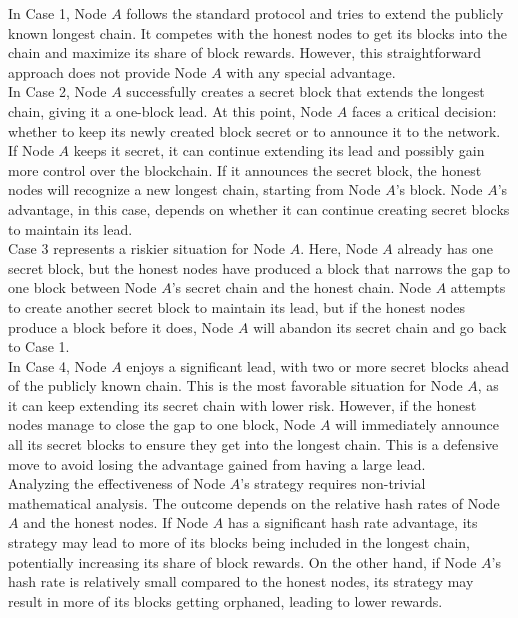 In Case 1, Node $A$ follows the standard protocol and tries to extend the publicly known longest chain. It competes with the honest nodes to get its blocks into the chain and maximize its share of block rewards. However, this straightforward approach does not provide Node $A$ with any special advantage.\\

In Case 2, Node $A$ successfully creates a secret block that extends the longest chain, giving it a one-block lead. At this point, Node $A$ faces a critical decision: whether to keep its newly created block secret or to announce it to the network. If Node $A$ keeps it secret, it can continue extending its lead and possibly gain more control over the blockchain. If it announces the secret block, the honest nodes will recognize a new longest chain, starting from Node $A$'s block. Node $A$'s advantage, in this case, depends on whether it can continue creating secret blocks to maintain its lead.\\

Case 3 represents a riskier situation for Node $A$. Here, Node $A$ already has one secret block, but the honest nodes have produced a block that narrows the gap to one block between Node $A$'s secret chain and the honest chain. Node $A$ attempts to create another secret block to maintain its lead, but if the honest nodes produce a block before it does, Node $A$ will abandon its secret chain and go back to Case 1.\\

In Case 4, Node $A$ enjoys a significant lead, with two or more secret blocks ahead of the publicly known chain. This is the most favorable situation for Node $A$, as it can keep extending its secret chain with lower risk. However, if the honest nodes manage to close the gap to one block, Node $A$ will immediately announce all its secret blocks to ensure they get into the longest chain. This is a defensive move to avoid losing the advantage gained from having a large lead.\\

Analyzing the effectiveness of Node $A$'s strategy requires non-trivial mathematical analysis. The outcome depends on the relative hash rates of Node $A$ and the honest nodes. If Node $A$ has a significant hash rate advantage, its strategy may lead to more of its blocks being included in the longest chain, potentially increasing its share of block rewards. On the other hand, if Node $A$'s hash rate is relatively small compared to the honest nodes, its strategy may result in more of its blocks getting orphaned, leading to lower rewards.\\

